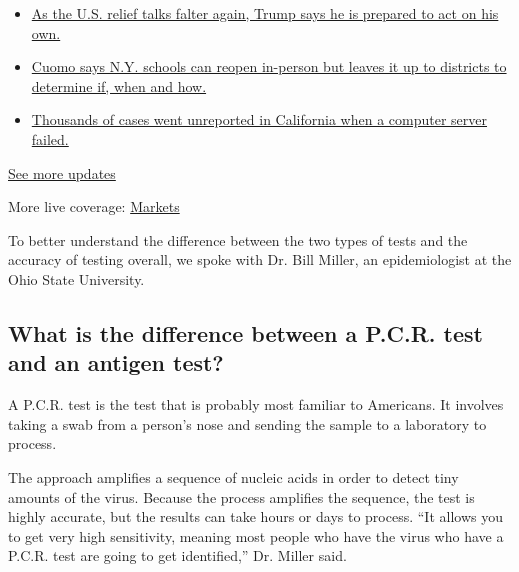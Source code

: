 \begin{itemize}
\tightlist
\item
  \href{https://www.nytimes.com/2020/08/07/world/covid-19-news.html?action=click\&pgtype=Article\&state=default\&region=MAIN_CONTENT_1\&context=storylines_live_updates\#link-1f86d03a}{As
  the U.S. relief talks falter again, Trump says he is prepared to act
  on his own.}
\item
  \href{https://www.nytimes.com/2020/08/07/world/covid-19-news.html?action=click\&pgtype=Article\&state=default\&region=MAIN_CONTENT_1\&context=storylines_live_updates\#link-3f64a70a}{Cuomo
  says N.Y. schools can reopen in-person but leaves it up to districts
  to determine if, when and how.}
\item
  \href{https://www.nytimes.com/2020/08/07/world/covid-19-news.html?action=click\&pgtype=Article\&state=default\&region=MAIN_CONTENT_1\&context=storylines_live_updates\#link-14e70066}{Thousands
  of cases went unreported in California when a computer server failed.}
\end{itemize}

\href{https://www.nytimes.com/2020/08/07/world/covid-19-news.html?action=click\&pgtype=Article\&state=default\&region=MAIN_CONTENT_1\&context=storylines_live_updates}{See
more updates}

More live coverage:
\href{https://www.nytimes.com/live/2020/08/07/business/stock-market-today-coronavirus?action=click\&pgtype=Article\&state=default\&region=MAIN_CONTENT_1\&context=storylines_live_updates}{Markets}

To better understand the difference between the two types of tests and
the accuracy of testing overall, we spoke with Dr. Bill Miller, an
epidemiologist at the Ohio State University.

\hypertarget{what-is-the-difference-between-a-pcr-test-and-an-antigen-test}{%
\subsection{What is the difference between a P.C.R. test and an antigen
test?}\label{what-is-the-difference-between-a-pcr-test-and-an-antigen-test}}

A P.C.R. test is the test that is probably most familiar to Americans.
It involves taking a swab from a person's nose and sending the sample to
a laboratory to process.

The approach amplifies a sequence of nucleic acids in order to detect
tiny amounts of the virus. Because the process amplifies the sequence,
the test is highly accurate, but the results can take hours or days to
process. ``It allows you to get very high sensitivity, meaning most
people who have the virus who have a P.C.R. test are going to get
identified,'' Dr. Miller said.

